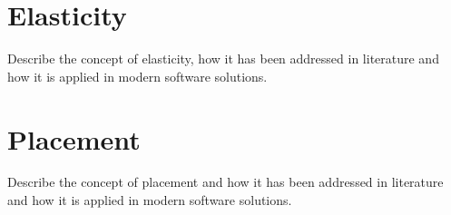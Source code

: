 \section{Elasticity}
\label{sec:containers-orchestration-elasticity}
Describe the concept of elasticity, how it has been addressed in literature and how it is applied in modern software solutions.


\section{Placement}
\label{sec:containers-orchestration-elasticity}
Describe the concept of placement and how it has been addressed in literature and how it is applied in modern software solutions.